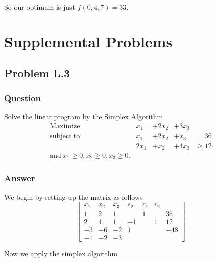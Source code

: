 \documentclass[12pt]{article}
\begin{document}
So our optimum is just $f(0,4,7)=33$.


\section{Supplemental Problems}

\subsection{Problem L.3}
\subsubsection{Question}
Solve the linear program by the Simplex Algorithm
\[\begin{array}{ccccc} 
\mathrm{Maximize} & x_1& +2x_2 & +3x_3\\
\mathrm{subject\ to}& x_1&+2x_2&+x_3 &=36\\
&2x_1&+x_2&+ 4 x_3& \geq 12\\
\mathrm{and\ }x_1\geq 0, x_2\geq 0, x_3 \geq 0.
 \end{array}\]
\subsubsection{Answer}
We begin by setting up the matrix as follows
\[
\left[ \begin{array} {lll|l|ll|l}
x_1 & x_2 & x_3  & s_2 & r_1 &r_2\\
\hline
1&2&1&&1&&36\\
2&4&1&-1&&1&12\\
\hline
-3&-6&-2&1&&&-48\\
-1&-2&-3&&&&
\end{array}\right]
\]


Now we apply the simplex algorithm
\end{document}
